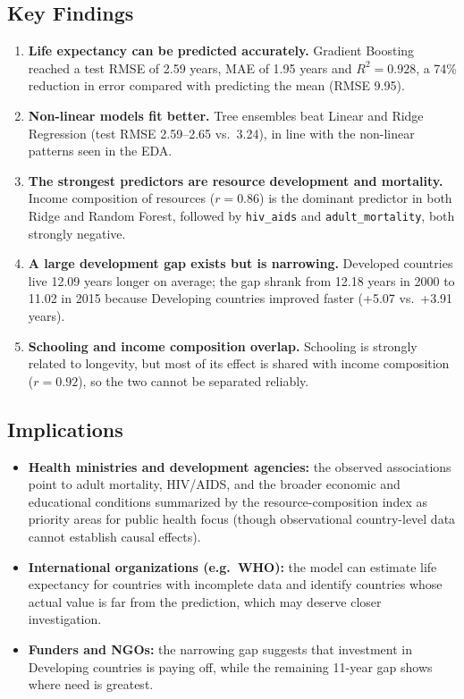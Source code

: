 \documentclass[12pt,a4paper]{article}
\begin{document}
\subsection{Key Findings}
\begin{enumerate}
  \item \textbf{Life expectancy can be predicted accurately.} Gradient Boosting reached a test RMSE
        of 2.59 years, MAE of 1.95 years and $R^2=0.928$, a 74\% reduction in error compared with
        predicting the mean (RMSE 9.95).
  \item \textbf{Non-linear models fit better.} Tree ensembles beat Linear and Ridge Regression
        (test RMSE 2.59--2.65 vs.\ 3.24), in line with the non-linear patterns seen in the EDA.
  \item \textbf{The strongest predictors are resource development and mortality.}
        Income composition of resources ($r=0.86$) is the dominant predictor in both
        Ridge and Random Forest, followed by \texttt{hiv\_aids} and \texttt{adult\_mortality},
        both strongly negative.
  \item \textbf{A large development gap exists but is narrowing.} Developed countries live 12.09
        years longer on average; the gap shrank from 12.18 years in 2000 to 11.02 in 2015 because
        Developing countries improved faster (+5.07 vs.\ +3.91 years).
  \item \textbf{Schooling and income composition overlap.} Schooling is strongly related to
        longevity, but most of its effect is shared with income composition ($r=0.92$), so the
        two cannot be separated reliably.
\end{enumerate}

\subsection{Implications}
\begin{itemize}
  \item \textbf{Health ministries and development agencies:} the observed associations point to
        adult mortality, HIV/AIDS, and the broader economic and educational conditions summarized by
        the resource-composition index as priority areas for public health focus (though
        observational country-level data cannot establish causal effects).
  \item \textbf{International organizations (e.g.\ WHO):} the model can estimate life expectancy
        for countries with incomplete data and identify countries whose actual value is far from the
        prediction, which may deserve closer investigation.
  \item \textbf{Funders and NGOs:} the narrowing gap suggests that investment in Developing
        countries is paying off, while the remaining 11-year gap shows where need is greatest.
\end{itemize}
\end{document}
